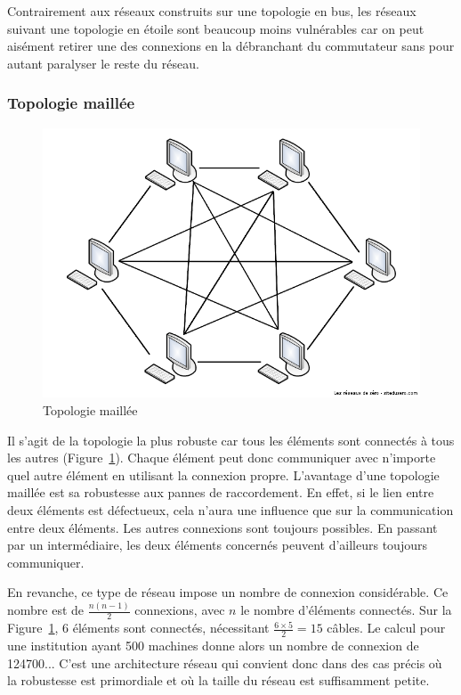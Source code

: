 Contrairement aux réseaux construits sur une topologie en bus, les réseaux suivant une topologie en étoile sont beaucoup moins vulnérables car on peut aisément retirer une des connexions en la débranchant du commutateur sans pour autant paralyser le reste du réseau.

\subsubsection{Topologie maillée}
\begin{figure}[h!]
  \centering
  \includegraphics[width=.4\textwidth]{images/topologies/topologieMaillee}
  \caption{Topologie maillée}
  \label{fig:topoMaillee}
\end{figure}

Il s'agit de la topologie la plus robuste car tous les éléments sont connectés à tous les autres (Figure~\ref{fig:topoMaillee}). Chaque élément peut donc communiquer avec n'importe quel autre élément en utilisant la connexion propre. L'avantage d'une topologie maillée est sa robustesse aux pannes de raccordement. En effet, si le lien entre deux éléments est défectueux, cela n'aura une influence que sur la communication entre deux éléments. Les autres connexions sont toujours possibles. En passant par un intermédiaire, les deux éléments concernés peuvent d'ailleurs toujours communiquer.

En revanche, ce type de réseau impose un nombre de connexion considérable. Ce nombre est de $\frac{n(n-1)}{2}$ connexions, avec $n$ le nombre d'éléments connectés. Sur la Figure~\ref{fig:topoMaillee}, 6 éléments sont connectés, nécessitant $\frac{6 \times 5}{2} = 15$ câbles. Le calcul pour une institution ayant 500 machines donne alors un nombre de connexion de \num{124700}... C'est une architecture réseau qui convient donc dans des cas précis où la robustesse est primordiale et où la taille du réseau est suffisamment petite.
